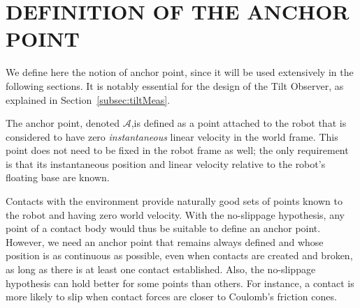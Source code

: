 \documentclass{IJCAS}
\begin{document}
\section{DEFINITION OF THE ANCHOR POINT}\label{sec:anchor_point}
We define here the notion of anchor point, since it will be used extensively in the following sections. It is notably essential for the design of the Tilt Observer, as explained in Section~\ref{subsec:tiltMeas}.

The anchor point, denoted $\mathcal{A}$,is defined as a point attached to the robot that is considered to have zero \emph{instantaneous} linear velocity in the world frame. This point does not need to be fixed in the robot frame as well; the only requirement is that its instantaneous position and linear velocity relative to the robot's floating base are known.

Contacts with the environment provide naturally good sets of points known to the robot and having zero world velocity. With the no-slippage hypothesis, any point of a contact body would thus be suitable to define an anchor point. However, we need an anchor point that remains always defined and whose position is as continuous as possible, even when contacts are created and broken, as long as there is at least one contact established. Also, the no-slippage hypothesis can hold better for some points than others. For instance, a contact is more likely to slip when contact forces are closer to Coulomb's friction cones.
\end{document}
